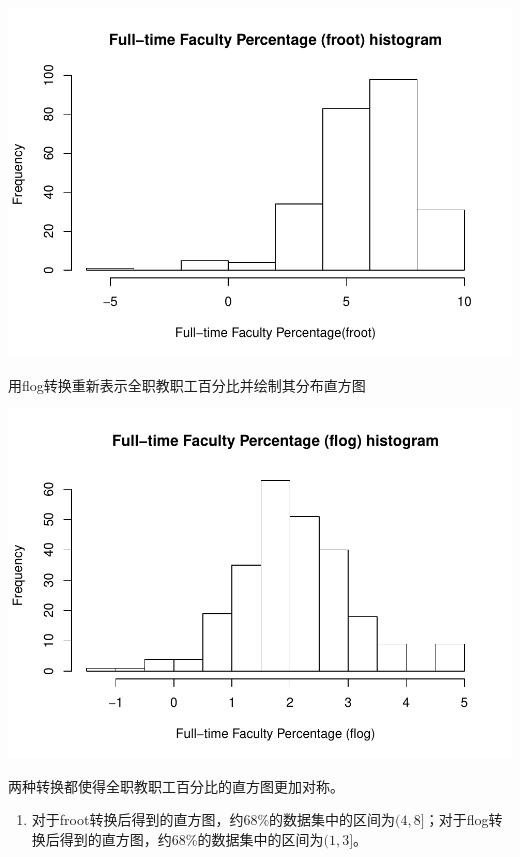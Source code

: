 \documentclass[]{article}
\newenvironment{Shaded}{\begin{snugshade}}{\end{snugshade}}
\newcommand{\DataTypeTok}[1]{\textcolor[rgb]{0.13,0.29,0.53}{#1}}
\newcommand{\DecValTok}[1]{\textcolor[rgb]{0.00,0.00,0.81}{#1}}
\newcommand{\KeywordTok}[1]{\textcolor[rgb]{0.13,0.29,0.53}{\textbf{#1}}}
\newcommand{\NormalTok}[1]{#1}
\newcommand{\OperatorTok}[1]{\textcolor[rgb]{0.81,0.36,0.00}{\textbf{#1}}}
\newcommand{\StringTok}[1]{\textcolor[rgb]{0.31,0.60,0.02}{#1}}
\providecommand{\tightlist}{%
  \setlength{\itemsep}{0pt}\setlength{\parskip}{0pt}}
\begin{document}
\includegraphics{Homework_5_files/figure-latex/unnamed-chunk-3-1.pdf}

用flog转换重新表示全职教职工百分比并绘制其分布直方图

\begin{Shaded}
\end{Shaded}

\includegraphics{Homework_5_files/figure-latex/unnamed-chunk-4-1.pdf}

两种转换都使得全职教职工百分比的直方图更加对称。

\begin{enumerate}
\def\labelenumi{\alph{enumi}.}
\setcounter{enumi}{2}
\tightlist
\item
  对于froot转换后得到的直方图，约\(68\%\)的数据集中的区间为\((4,8]\)；对于flog转换后得到的直方图，约\(68\%\)的数据集中的区间为\((1,3]\)。
\end{enumerate}
\end{document}
